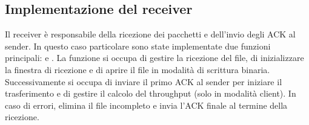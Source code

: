 \subsection{Implementazione del receiver}
Il receiver è responsabile della ricezione dei pacchetti e dell'invio degli ACK al sender.
In questo caso particolare sono state implementate due funzioni principali:  e .
La funzione  si occupa di gestire la ricezione del file, di inizializzare la finestra di ricezione e di aprire il file in modalità di scrittura binaria.
Successivamente si occupa di inviare il primo ACK al sender per iniziare il trasferimento e di gestire il calcolo del throughput (solo in modalità client).
In caso di errori, elimina il file incompleto e invia l'ACK finale al termine della ricezione.

